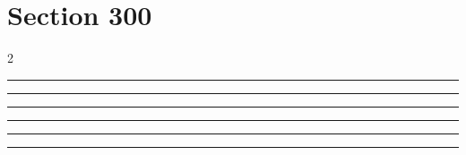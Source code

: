 \documentclass[11pt,a4paper]{article}
\begin{document}
\section{Section 300}
\begin{multicols}{2}
\begin{swarmwrap}%
  \begin{minipage}[t]{2cm}
    \centering
    \textcolor{blue!30}{\rule{\linewidth}{5cm}}
  \end{minipage}%
\end{swarmwrap}%
\swarmwrapnext\lipsum[1]\lipsum[2]
\end{multicols}
\begin{swarmwrap}%
  \begin{minipage}[t]{3cm}
    \centering
    \textcolor{red!20}{\rule{\linewidth}{6cm}}
  \end{minipage}%
\end{swarmwrap}%
\swarmwrapnext\lipsum[1]\lipsum[2]
\begin{swarmwrap}%
  \begin{minipage}[t]{4cm}
    \centering
    \textcolor{red!20}{\rule{\linewidth}{7cm}}
  \end{minipage}%
\end{swarmwrap}%
\swarmwrapnext\lipsum[1]\lipsum[2]\lipsum[3]
\begin{swarmwrap}%
  \begin{minipage}[t]{5cm}
    \centering
    \textcolor{red!20}{\rule{\linewidth}{8cm}}
  \end{minipage}%
\end{swarmwrap}%
\swarmwrapnext\lipsum[1]\lipsum[2]\lipsum[3]\lipsum[4]
\begin{swarmwrap}%
  \begin{minipage}[t]{2cm}
    \centering
    \textcolor{red!20}{\rule{\linewidth}{9cm}}
  \end{minipage}%
\end{swarmwrap}%
\swarmwrapnext\lipsum[1]\lipsum[2]\lipsum[3]\lipsum[4]\lipsum[5]
\begin{swarmwrap}%
  \begin{minipage}[t]{3cm}
    \centering
    \textcolor{red!20}{\rule{\linewidth}{10cm}}
  \end{minipage}%
\end{swarmwrap}%
\end{document}

